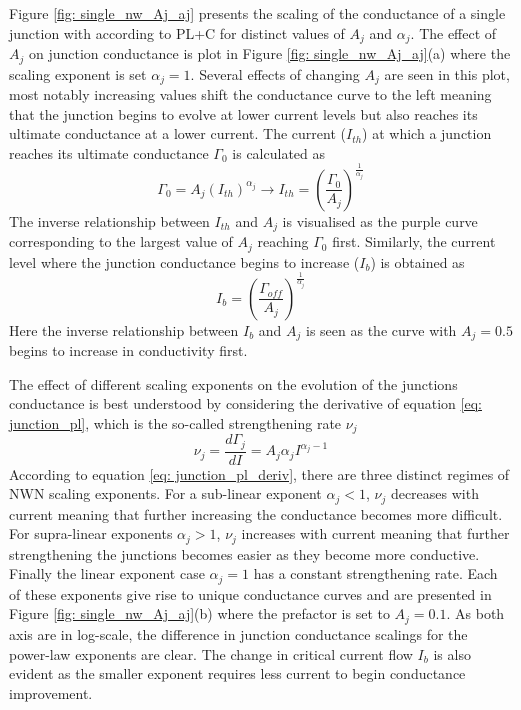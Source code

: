 Figure \ref{fig: single_nw_Aj_aj} presents the scaling of the conductance of a single junction with according to PL+C for distinct values of $A_j$ and $\alpha_j$. The effect of $A_j$ on junction conductance is plot in Figure \ref{fig: single_nw_Aj_aj}(a) where the scaling exponent is set $\alpha_j = 1$. Several effects of changing $A_j$ are seen in this plot, most notably increasing values shift the conductance curve to the left meaning that the junction begins to evolve at lower current levels but also reaches its ultimate conductance at a lower current. The current ($I_{th}$) at which a junction reaches its ultimate conductance $\Gamma_0$ is calculated as
\begin{equation}
\Gamma_0 = A_j (I_{th})^{\alpha_j} \rightarrow I_{th} = \left(\frac{\Gamma_0}{A_j}\right)^{\frac{1}{\alpha_j}} 
\end{equation}
The inverse relationship between $I_{th}$ and $A_j$ is visualised as the purple curve corresponding to the largest value of $A_j$ reaching $\Gamma_0$ first. Similarly, the current level where the junction conductance begins to increase ($I_{b}$) is obtained as
\begin{equation}
I_b = \left(\frac{\Gamma_{off}}{A_j}\right)^{\frac{1}{\alpha_j}} 
\label{eq:conductance_off_threshold}
\end{equation}
Here the inverse relationship between $I_b$ and $A_j$ is seen as the curve with $A_j = 0.5$ begins to increase in conductivity first.

The effect of different scaling exponents on the evolution of the junctions conductance is best understood by considering the derivative of equation \ref{eq: junction_pl}, which is the so-called strengthening rate $\nu_j$ 
\begin{equation}
\nu_j = \frac{d \Gamma_j}{dI} = A_j \alpha_j I^{\alpha_j - 1}
\label{eq: junction_pl_deriv}
\end{equation}
According to equation \ref{eq: junction_pl_deriv}, there are three distinct regimes of NWN scaling exponents. For a sub-linear exponent $\alpha_j <1$, $\nu_j$ decreases with current meaning that further increasing the conductance becomes more difficult. For supra-linear exponents $\alpha_j > 1$, $\nu_j$ increases with current meaning that further strengthening the junctions becomes easier as they become more conductive. Finally the linear exponent case $\alpha_j = 1$ has a constant strengthening rate. Each of these exponents give rise to unique conductance curves and are presented in Figure \ref{fig: single_nw_Aj_aj}(b) where the prefactor is set to $A_j = 0.1$. As both axis are in log-scale, the difference in junction conductance scalings for the power-law exponents are clear. The change in critical current flow $I_{b}$ is also evident as the smaller exponent requires less current to begin conductance improvement.

